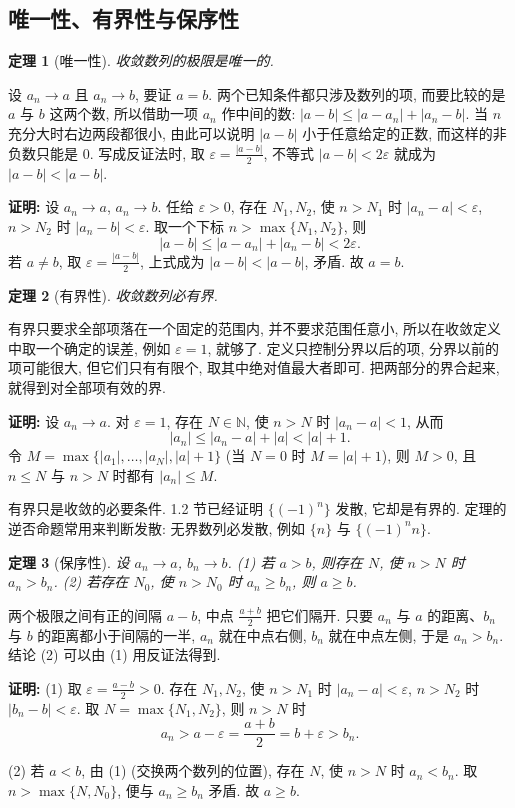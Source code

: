 \documentclass[UTF8,openany]{ctexbook}
\theoremstyle{chinesetextbook}
\newtheorem{theorem}{定理}[section]
\newenvironment{cnproof}{\par\indent\textbf{证明:} \ignorespaces}{\par}
\begin{document}
\subsection{唯一性、有界性与保序性}
\begin{theorem}[唯一性]
收敛数列的极限是唯一的.
\end{theorem}
设 $a_n\to a$ 且 $a_n\to b$, 要证 $a=b$. 两个已知条件都只涉及数列的项, 而要比较的是 $a$ 与 $b$ 这两个数, 所以借助一项 $a_n$ 作中间的数: $|a-b|\le|a-a_n|+|a_n-b|$. 当 $n$ 充分大时右边两段都很小, 由此可以说明 $|a-b|$ 小于任意给定的正数, 而这样的非负数只能是 $0$. 写成反证法时, 取 $\displaystyle\varepsilon=\frac{|a-b|}2$, 不等式 $|a-b|<2\varepsilon$ 就成为 $|a-b|<|a-b|$.
\begin{cnproof}
设 $a_n\to a$, $a_n\to b$. 任给 $\varepsilon>0$, 存在 $N_1,N_2$, 使 $n>N_1$ 时 $|a_n-a|<\varepsilon$, $n>N_2$ 时 $|a_n-b|<\varepsilon$. 取一个下标 $n>\max\{N_1,N_2\}$, 则
\[
|a-b|\le|a-a_n|+|a_n-b|<2\varepsilon.
\]
若 $a\ne b$, 取 $\displaystyle\varepsilon=\frac{|a-b|}2$, 上式成为 $|a-b|<|a-b|$, 矛盾. 故 $a=b$.
\end{cnproof}
\begin{theorem}[有界性]
收敛数列必有界.
\end{theorem}
有界只要求全部项落在一个固定的范围内, 并不要求范围任意小, 所以在收敛定义中取一个确定的误差, 例如 $\varepsilon=1$, 就够了. 定义只控制分界以后的项, 分界以前的项可能很大, 但它们只有有限个, 取其中绝对值最大者即可. 把两部分的界合起来, 就得到对全部项有效的界.
\begin{cnproof}
设 $a_n\to a$. 对 $\varepsilon=1$, 存在 $N\in\mathbb N$, 使 $n>N$ 时 $|a_n-a|<1$, 从而
\[
|a_n|\le|a_n-a|+|a|<|a|+1.
\]
令 $M=\max\{|a_1|,\ldots,|a_N|,|a|+1\}$ (当 $N=0$ 时 $M=|a|+1$), 则 $M>0$, 且 $n\le N$ 与 $n>N$ 时都有 $|a_n|\le M$.
\end{cnproof}
有界只是收敛的必要条件. 1.2 节已经证明 $\{(-1)^n\}$ 发散, 它却是有界的. 定理的逆否命题常用来判断发散: 无界数列必发散, 例如 $\{n\}$ 与 $\{(-1)^nn\}$.
\begin{theorem}[保序性]
设 $a_n\to a$, $b_n\to b$. \textup{(1)} 若 $a>b$, 则存在 $N$, 使 $n>N$ 时 $a_n>b_n$. \textup{(2)} 若存在 $N_0$, 使 $n>N_0$ 时 $a_n\ge b_n$, 则 $a\ge b$.
\end{theorem}
两个极限之间有正的间隔 $a-b$, 中点 $\displaystyle\frac{a+b}2$ 把它们隔开. 只要 $a_n$ 与 $a$ 的距离、$b_n$ 与 $b$ 的距离都小于间隔的一半, $a_n$ 就在中点右侧, $b_n$ 就在中点左侧, 于是 $a_n>b_n$. 结论 (2) 可以由 (1) 用反证法得到.
\begin{cnproof}
(1) 取 $\displaystyle\varepsilon=\frac{a-b}2>0$. 存在 $N_1,N_2$, 使 $n>N_1$ 时 $|a_n-a|<\varepsilon$, $n>N_2$ 时 $|b_n-b|<\varepsilon$. 取 $N=\max\{N_1,N_2\}$, 则 $n>N$ 时
\[
a_n>a-\varepsilon=\frac{a+b}2=b+\varepsilon>b_n.
\]

(2) 若 $a<b$, 由 (1) (交换两个数列的位置), 存在 $N$, 使 $n>N$ 时 $a_n<b_n$. 取 $n>\max\{N,N_0\}$, 便与 $a_n\ge b_n$ 矛盾. 故 $a\ge b$.
\end{cnproof}
\end{document}

